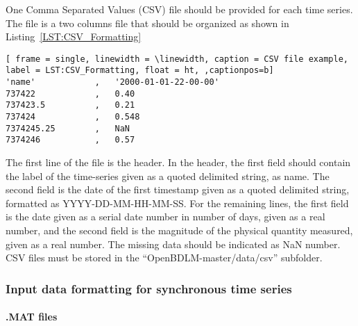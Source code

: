 \documentclass{article}
\begin{document}
One Comma Separated Values (CSV) file should be provided for each time series.
The file is a two columns file that should be organized as shown in Listing~\ref{LST:CSV_Formatting}
\begin{lstlisting}[ frame = single, linewidth = \linewidth, caption = CSV file example,  label = LST:CSV_Formatting, float = ht, ,captionpos=b]
'name'            ,   '2000-01-01-22-00-00'
737422            ,   0.40
737423.5          ,   0.21
737424            ,   0.548
7374245.25        ,   NaN
7374246           ,   0.57
\end{lstlisting}    
The first line of the file is the header.
In the header, the first field should contain the label of the time-series given as a quoted delimited string, as \textquotesingle name\textquotesingle .
The second field is the date of the first timestamp given as a quoted delimited string, formatted as \textquotesingle YYYY-DD-MM-HH-MM-SS\textquotesingle.  
For the remaining lines, the first field is the date given as a serial date number in number of days, given as a real number, and the second field is the magnitude of the physical quantity measured, given as a real number.
The missing data should be indicated as NaN number.
CSV files must be stored in the ``OpenBDLM-master/data/csv'' subfolder.

\subsubsection{Input data formatting for synchronous time series}
\paragraph{\MATLAB{} .MAT files}
\label{PAR:MATfile}
\end{document}
